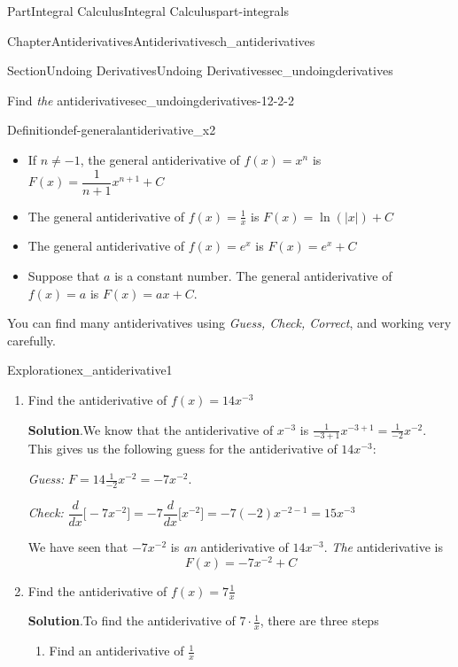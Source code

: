\documentclass[oneside,10pt,]{tufte-book}
\newcommand{\blocktitlefont}{\relax}
\numberwithin{equation}{chapter}
\newcommand{\ddx}[1]{ \dfrac{d}{dx} \Big[ #1 \Big]  }
\begin{document}
\begin{partptx}{Part}{Integral Calculus}{}{Integral Calculus}{}{}{part-integrals}
\begin{chapterptx}{Chapter}{Antiderivatives}{}{Antiderivatives}{}{}{ch_antiderivatives}
\begin{sectionptx}{Section}{Undoing Derivatives}{}{Undoing Derivatives}{}{}{sec_undoingderivatives}
\begin{descriptionlist}
\begin{dlimedium}{Find \emph{the} antiderivative}{sec_undoingderivatives-12-2-2}
\end{dlimedium}%
\end{descriptionlist}
%
\begin{definition}{Definition}{}{def-generalantiderivative_x2}%
%
\begin{itemize}[label=\textbullet]
\item{}If \(n\neq -1\), the general antiderivative of \(f(x)=x^n\) is \(F(x) = \dfrac{1}{n+1}x^{n+1} + C \)%
\item{}The general antiderivative of \(f(x)=\frac{1}{x}\) is \(F(x) = \ln(|x|) + C \)%
\item{}The general antiderivative of \(f(x)=e^x\) is \(F(x) = e^x + C \)%
\item{}Suppose that \(a\) is a constant number. The general antiderivative of \(f(x)=a\) is \(F(x) = ax + C\).%
\end{itemize}
%
\end{definition}
You can find many antiderivatives using \emph{Guess, Check, Correct}, and working very carefully.%
\begin{exploration}{Exploration}{}{ex_antiderivative1}%
\begin{enumerate}[font=\bfseries,label=(\alph*),ref=\alph*]%
\item{}Find the antiderivative of \(f(x) = 14x^{-3}\)%
\par\smallskip%
\noindent\textbf{\blocktitlefont Solution}.\hypertarget{ex_antiderivative1-1-2}{}\quad{}We know that the antiderivative of \(x^{-3}\) is \(\frac{1}{-3+1}x^{-3+1} = \frac{1}{-2}x^{-2}\). This gives us the following guess for the antiderivative of \(14x^{-3}\):%
\par
\emph{Guess:} \(F = 14\frac{1}{-2}x^{-2} = -7x^{-2}\).%
\par
\emph{Check:} \(\ddx{ -7x^{-2} }= -7 \ddx{x^{-2}} = -7(-2)x^{-2-1} = 15x^{-3}\)%
\par
We have seen that \(-7x^{-2}\) is \emph{an} antiderivative of \(14x^{-3}\).  \emph{The} antiderivative is%
\begin{equation*}
F(x) = -7x^{-2} + C
\end{equation*}
%
\item{}Find the antiderivative of \(f(x) = 7\frac{1}{x}\)%
\par\smallskip%
\noindent\textbf{\blocktitlefont Solution}.\hypertarget{ex_antiderivative1-2-2}{}\quad{}To find the antiderivative of \(7\cdot\frac{1}{x}\), there are three steps%
\begin{enumerate}
\item{}Find an antiderivative of \(\frac{1}{x}\)%

\end{enumerate}
\end{enumerate}
\end{exploration}
\end{sectionptx}
\end{chapterptx}
\end{partptx}
\end{document}
